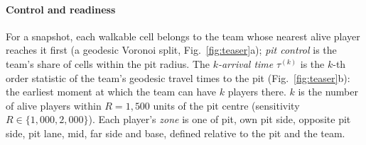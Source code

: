 \paragraph*{Control and readiness}
For a snapshot, each walkable cell belongs to the team whose nearest alive player reaches it first (a geodesic Voronoi split, Fig.~\ref{fig:teaser}a); \emph{pit control} is the team's share of cells within the pit radius.
The \emph{$k$-arrival time} $\tau^{(k)}$ is the $k$-th order statistic of the team's geodesic travel times to the pit (Fig.~\ref{fig:teaser}b): the earliest moment at which the team can have $k$ players there.
$k$ is the number of alive players within $R=1{,}500$ units of the pit centre (sensitivity $R\in\{1{,}000,2{,}000\}$).
Each player's \emph{zone} is one of pit, own pit side, opposite pit side, pit lane, mid, far side and base, defined relative to the pit and the team.
